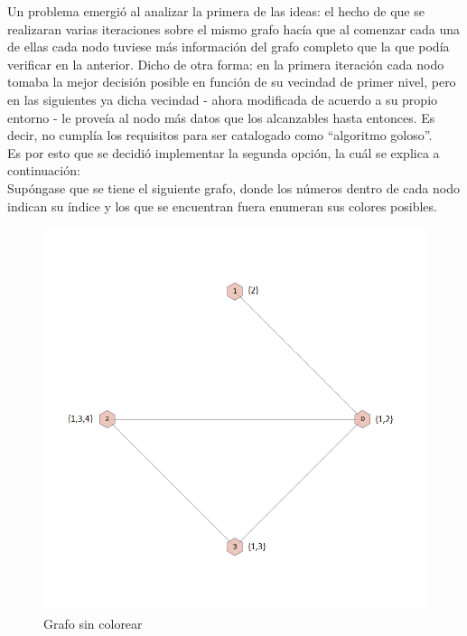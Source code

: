 Un problema emergió al analizar la primera de las ideas: el hecho de que se realizaran varias iteraciones sobre el mismo grafo hacía que al comenzar cada una de ellas cada nodo tuviese más información del grafo completo que la que podía verificar en la anterior. Dicho de otra forma: en la primera iteración cada nodo tomaba la mejor decisión posible en función de su vecindad de primer nivel, pero en las siguientes ya dicha vecindad - ahora modificada de acuerdo a su propio entorno - le proveía al nodo más datos que los alcanzables hasta entonces. Es decir, no cumplía los requisitos para ser catalogado como ``algoritmo goloso''.\\
Es por esto que se decidió implementar la segunda opción, la cuál se explica a continuación:\\
Supóngase que se tiene el siguiente grafo, donde los números dentro de cada nodo indican su índice y los que se encuentran fuera enumeran sus colores posibles.\\

 \begin{figure}[H]
    \begin{center}
  	\includegraphics[width=13cm]{imagenes/Ej3/4Nodos0.png}
 	\caption{Grafo sin colorear}
 	\label{sinColor}
    \end{center}
  \end{figure}


